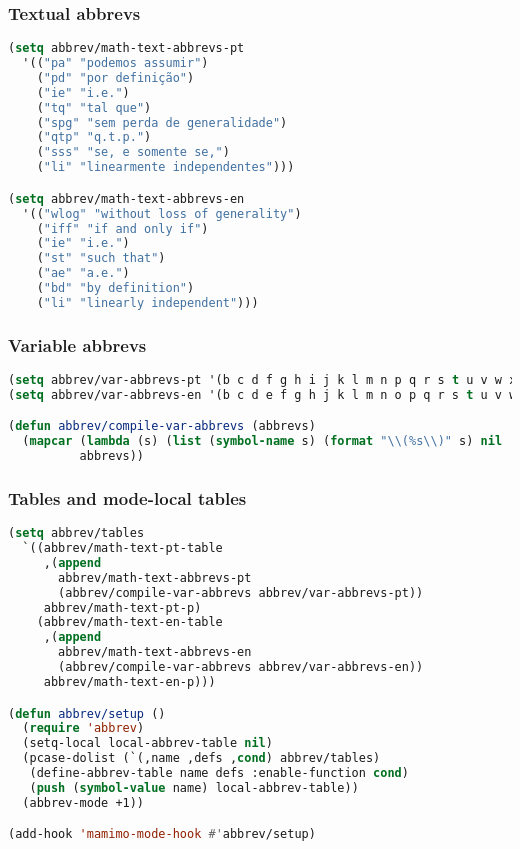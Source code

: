 \documentclass[11pt]{article}
\begin{document}
\subsubsection{Textual abbrevs}
\label{sec:textual-abbrevs}
\begin{lstlisting}[language=Lisp]
(setq abbrev/math-text-abbrevs-pt
  '(("pa" "podemos assumir")
    ("pd" "por definição")
    ("ie" "i.e.")
    ("tq" "tal que")
    ("spg" "sem perda de generalidade")
    ("qtp" "q.t.p.")
    ("sss" "se, e somente se,")
    ("li" "linearmente independentes")))

(setq abbrev/math-text-abbrevs-en
  '(("wlog" "without loss of generality")
    ("iff" "if and only if")
    ("ie" "i.e.")
    ("st" "such that")
    ("ae" "a.e.")
    ("bd" "by definition")
    ("li" "linearly independent")))
\end{lstlisting}

\subsubsection{Variable abbrevs}
\label{sec:variable-abbrevs}
\begin{lstlisting}[language=Lisp]
(setq abbrev/var-abbrevs-pt '(b c d f g h i j k l m n p q r s t u v w x y z))
(setq abbrev/var-abbrevs-en '(b c d e f g h j k l m n o p q r s t u v w x y z))

(defun abbrev/compile-var-abbrevs (abbrevs)
  (mapcar (lambda (s) (list (symbol-name s) (format "\\(%s\\)" s) nil :system t))
          abbrevs))
\end{lstlisting}

\subsubsection{Tables and mode-local tables}
\label{sec:tables-and-mode-local-tables}
\begin{lstlisting}[language=Lisp]
(setq abbrev/tables
  `((abbrev/math-text-pt-table
     ,(append
       abbrev/math-text-abbrevs-pt
       (abbrev/compile-var-abbrevs abbrev/var-abbrevs-pt))
     abbrev/math-text-pt-p)
    (abbrev/math-text-en-table
     ,(append
       abbrev/math-text-abbrevs-en
       (abbrev/compile-var-abbrevs abbrev/var-abbrevs-en))
     abbrev/math-text-en-p)))

(defun abbrev/setup ()
  (require 'abbrev)
  (setq-local local-abbrev-table nil)
  (pcase-dolist (`(,name ,defs ,cond) abbrev/tables)
   (define-abbrev-table name defs :enable-function cond)
   (push (symbol-value name) local-abbrev-table))
  (abbrev-mode +1))

(add-hook 'mamimo-mode-hook #'abbrev/setup)
\end{lstlisting}
\end{document}
